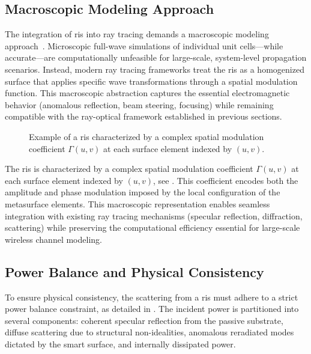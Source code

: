 \subsection{Macroscopic Modeling Approach}

The integration of \gls{ris} into ray tracing demands a macroscopic modeling approach~. Microscopic full-wave simulations of individual unit cells---while accurate---are computationally unfeasible for large-scale, system-level propagation scenarios. Instead, modern ray tracing frameworks treat the \gls{ris} as a homogenized surface that applies specific wave transformations through a spatial modulation function. This macroscopic abstraction captures the essential electromagnetic behavior (anomalous reflection, beam steering, focusing) while remaining compatible with the ray-optical framework established in previous sections.

\begin{figure}
  \centering
  \caption{Example of a \gls{ris} characterized by a complex spatial modulation coefficient $\Gamma(u,v)$ at each surface element indexed by $(u,v)$.}
\end{figure}

The \gls{ris} is characterized by a complex spatial modulation coefficient $\Gamma(u,v)$ at each surface element indexed by $(u,v)$, see . This coefficient encodes both the amplitude and phase modulation imposed by the local configuration of the metasurface elements. This macroscopic representation enables seamless integration with existing ray tracing mechanisms (specular reflection, diffraction, scattering) while preserving the computational efficiency essential for large-scale wireless channel modeling.

\subsection{Power Balance and Physical Consistency}

To ensure physical consistency, the scattering from a \gls{ris} must adhere to a strict power balance constraint, as detailed in . The incident power is partitioned into several components: coherent specular reflection from the passive substrate, diffuse scattering due to structural non-idealities, anomalous reradiated modes dictated by the smart surface, and internally dissipated power.

